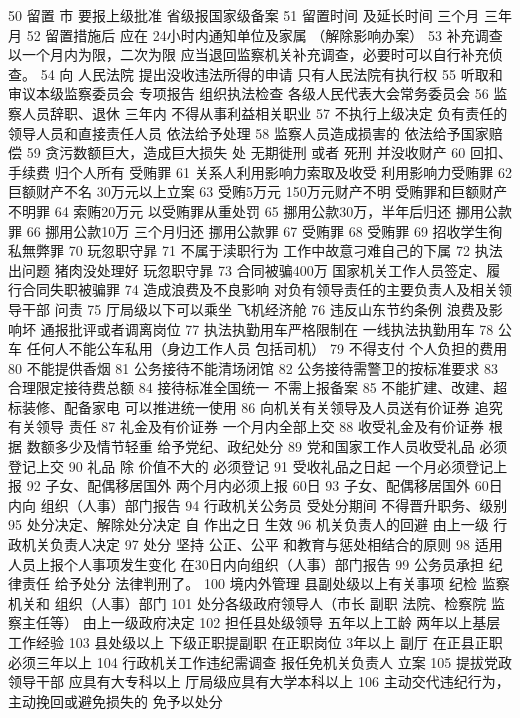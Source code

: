 \documentclass[cyan]{elegantnote}
\begin{document}
50 留置 市
要报上级批准 省级报国家级备案
51 留置时间 及延长时间
 三个月 三年月
52 留置措施后 应在
 24小时内通知单位及家属 （解除影响办案）
53 补充调查以一个月内为限，二次为限
应当退回监察机关补充调查，必要时可以自行补充侦查。
54 向 人民法院 提出没收违法所得的申请
只有人民法院有执行权
55 听取和审议本级监察委员会 专项报告 组织执法检查
各级人民代表大会常务委员会
56 监察人员辞职、退休 三年内 不得从事利益相关职业
57 不执行上级决定 负有责任的领导人员和直接责任人员
依法给予处理
58 监察人员造成损害的
依法给予国家赔偿
59 贪污数额巨大，造成巨大损失
处 无期徙刑 或者 死刑 并没收财产
60 回扣、手续费 归个人所有
受贿罪
61 关系人利用影响力索取及收受
利用影响力受贿罪
62 巨额财产不名
 30万元以上立案
63 受贿5万元 150万元财产不明
受贿罪和巨额财产不明罪
64 索贿20万元
以受贿罪从重处罚
65 挪用公款30万，半年后归还
挪用公款罪
66 挪用公款10万 三个月归还
挪用公款罪
67 受贿罪
68 受贿罪
69 招收学生徇私無弊罪
70 玩忽职守暃
71 不属于渎职行为
工作中故意刁难自己的下属
72 执法出问题 猪肉没处理好
玩忽职守暃
73 合同被骗400万
国家机关工作人员签定、履行合同失职被骗罪
74 造成浪费及不良影响 对负有领导责任的主要负责人及相关领导干部
问责
75 厅局级以下可以乘坐
飞机经济舱
76 违反山东节约条例 浪费及影响坏
通报批评或者调离岗位
77 执法执勤用车严格限制在
一线执法执勤用车
78 公车
任何人不能公车私用（身边工作人员 包括司机）
79 不得支付 个人负担的费用
80 不能提供香烟
81 公务接待不能清场闭馆
82 公务接待需警卫的按标准要求
83 合理限定接待费总额
84 接待标准全国统一
不需上报备案
85 不能扩建、改建、超标装修、配备家电
可以推进统一使用
86 向机关有关领导及人员送有价证券
追究 有关领导 责任
87 礼金及有价证券
一个月内全部上交
88 收受礼金及有价证券
根据 数额多少及情节轻重 给予党纪、政纪处分
89 党和国家工作人员收受礼品
必须登记上交
90 礼品
除 价值不大的 必须登记
91 受收礼品之日起
 一个月必须登记上报
92 子女、配偶移居国外
 两个月内必须上报 60日
93 子女、配偶移居国外
 60日内向 组织（人事）部门报告
94 行政机关公务员
受处分期间 不得晋升职务、级别
95 处分决定、解除处分决定
自 作出之日 生效
96 机关负责人的回避
由上一级 行政机关负责人决定
97 处分
坚持 公正、公平 和教育与惩处相结合的原则
98 适用人员上报个人事项发生变化
在30日内向组织（人事）部门报告
99 公务员承担
纪律责任 给予处分
法律判刑了。
100 境内外管理 县副处级以上有关事项
纪检 监察机关和 组织（人事）部门
101 处分各级政府领导人（市长 副职 法院、检察院 监察主任等）
由上一级政府决定
102 担任县处级领导
五年以上工龄 两年以上基层工作经验
103 县处级以上 下级正职提副职
在正职岗位 3年以上
副厅 在正县正职必须三年以上
104 行政机关工作违纪需调查
报任免机关负责人 立案
105 提拔党政领导干部 应具有大专科以上 厅局级应具有大学本科以上
106 主动交代违纪行为，主动挽回或避免损失的
免予以处分
\end{document}
